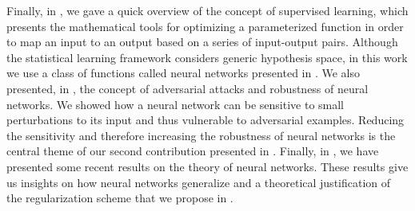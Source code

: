 Finally, in , we gave a quick overview of the concept of supervised learning, which presents the mathematical tools for optimizing a parameterized function in order to map an input to an output based on a series of input-output pairs.
Although the statistical learning framework considers generic hypothesis space, in this work we use a class of functions called neural networks presented in .
We also presented, in , the concept of adversarial attacks and robustness of neural networks.
We showed how a neural network can be sensitive to small perturbations to its input and thus vulnerable to adversarial examples.
Reducing the sensitivity and therefore increasing the robustness of neural networks is the central theme of our second contribution presented in .
Finally, in , we have presented some recent results on the theory of neural networks.
These results give us insights on how neural networks generalize and a theoretical justification of the regularization scheme that we propose in .





